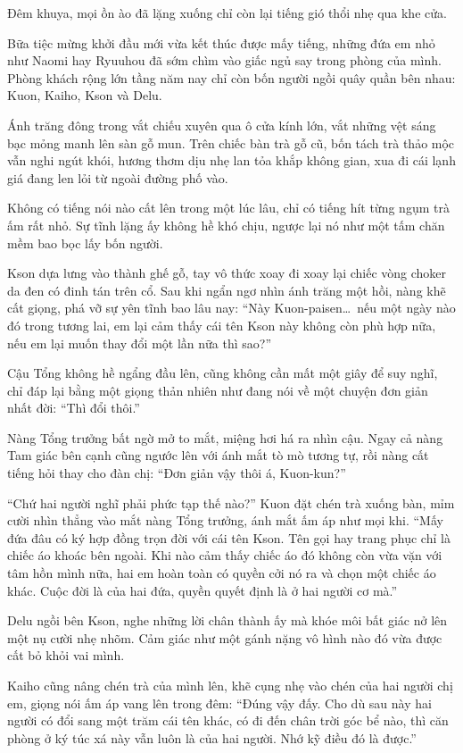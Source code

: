 ﻿\documentclass[../main.tex]{subfiles}
\begin{document}
\ct

Đêm khuya, mọi ồn ào đã lặng xuống chỉ còn lại tiếng gió thổi nhẹ qua khe cửa.

Bữa tiệc mừng khởi đầu mới vừa kết thúc được mấy tiếng, những đứa em nhỏ như Naomi hay Ryuuhou đã sớm chìm vào giấc ngủ say trong phòng của mình. Phòng khách rộng lớn tầng năm nay chỉ còn bốn người ngồi quây quần bên nhau: Kuon, Kaiho, Kson và Delu.

Ánh trăng đông trong vắt chiếu xuyên qua ô cửa kính lớn, vắt những vệt sáng bạc mỏng manh lên sàn gỗ mun. Trên chiếc bàn trà gỗ cũ, bốn tách trà thảo mộc vẫn nghi ngút khói, hương thơm dịu nhẹ lan tỏa khắp không gian, xua đi cái lạnh giá đang len lỏi từ ngoài đường phố vào.

Không có tiếng nói nào cất lên trong một lúc lâu, chỉ có tiếng hít từng ngụm trà ấm rất nhỏ. Sự tĩnh lặng ấy không hề khó chịu, ngược lại nó như một tấm chăn mềm bao bọc lấy bốn người.

Kson dựa lưng vào thành ghế gỗ, tay vô thức xoay đi xoay lại chiếc vòng choker da đen có đinh tán trên cổ. Sau khi ngẩn ngơ nhìn ánh trăng một hồi, nàng khẽ cất giọng, phá vỡ sự yên tĩnh bao lâu nay: ``Này Kuon-paisen\dots\ nếu một ngày nào đó trong tương lai, em lại cảm thấy cái tên Kson này không còn phù hợp nữa, nếu em lại muốn thay đổi một lần nữa thì sao?''

Cậu Tổng không hề ngẩng đầu lên, cũng không cần mất một giây để suy nghĩ, chỉ đáp lại bằng một giọng thản nhiên như đang nói về một chuyện đơn giản nhất đời: ``Thì đổi thôi.''

Nàng Tổng trưởng bất ngờ mở to mắt, miệng hơi há ra nhìn cậu. Ngay cả nàng Tam giác bên cạnh cũng ngước lên với ánh mắt tò mò tương tự, rồi nàng cất tiếng hỏi thay cho đàn chị: ``Đơn giản vậy thôi á, Kuon-kun?''

``Chứ hai người nghĩ phải phức tạp thế nào?'' Kuon đặt chén trà xuống bàn, mỉm cười nhìn thẳng vào mắt nàng Tổng trưởng, ánh mắt ấm áp như mọi khi. ``Mấy đứa đâu có ký hợp đồng trọn đời với cái tên Kson. Tên gọi hay trang phục chỉ là chiếc áo khoác bên ngoài. Khi nào cảm thấy chiếc áo đó không còn vừa vặn với tâm hồn mình nữa, hai em hoàn toàn có quyền cởi nó ra và chọn một chiếc áo khác. Cuộc đời là của hai đứa, quyền quyết định là ở hai người cơ mà.''

Delu ngồi bên Kson, nghe những lời chân thành ấy mà khóe môi bất giác nở lên một nụ cười nhẹ nhõm. Cảm giác như một gánh nặng vô hình nào đó vừa được cất bỏ khỏi vai mình.

Kaiho cũng nâng chén trà của mình lên, khẽ cụng nhẹ vào chén của hai người chị em, giọng nói ấm áp vang lên trong đêm: ``Đúng vậy đấy. Cho dù sau này hai người có đổi sang một trăm cái tên khác, có đi đến chân trời góc bể nào, thì căn phòng ở ký túc xá này vẫn luôn là của hai người. Nhớ kỹ điều đó là được.''
\end{document}
